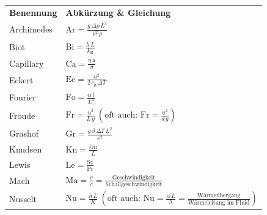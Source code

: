 \centering
\section*{}%

\setlength{\rowheight}{3.5mm}
\small

\begin{tabular}{l l}
    \xrowht[()]{\rowheight} \textbf{Benennung} & \textbf{Abkürzung \& Gleichung}                                                           \\[2.0ex]
    \xrowht[()]{\rowheight} Archimedes         & $\text{Ar} = \tfrac{g\,\Delta\rho\,L^3}{\nu^2\,\rho}$                                     \\
    \xrowht[()]{\rowheight} Biot               & $\text{Bi} = \tfrac{h\,L}{k_\text{B}}$                                                    \\
    \xrowht[()]{\rowheight} Capillary          & $\text{Ca} = \tfrac{\eta\,u}{\sigma}$                                                     \\
    \xrowht[()]{\rowheight} Eckert             & $\text{Ec} = \tfrac{u^2}{2\,c_p\,\Delta T}$                                               \\
    \xrowht[()]{\rowheight} Fourier            & $\text{Fo} = \tfrac{\alpha\,t}{L^2}$                                                      \\
    \xrowht[()]{\rowheight} Froude             & $\text{Fr} = \tfrac{u^2}{L\,g}~\left(\text{oft auch: Fr} = \tfrac{u^2}{d\,g}\right)$      \\
    \xrowht[()]{\rowheight} Grashof            & $\text{Gr} = \tfrac{g\,\beta\,\Delta T\,L^3}{\nu^2}$                                      \\
    \xrowht[()]{\rowheight} Knudsen            & $\text{Kn} = \tfrac{l\,m}{L}$                                                             \\
    \xrowht[()]{\rowheight} Lewis              & $\text{Le} = \tfrac{\text{Sc}}{\text{Pr}}$                                                \\
    \xrowht[()]{\rowheight} Mach               & $\text{Ma} = \tfrac{v}{c} = \tfrac{\text{Geschwindigkeit}}{\text{Schallgeschwindigkeit}}$ \\
    \xrowht[()]{\rowheight} Nusselt            & $\text{Nu} = \tfrac{h\,L}{K}~\left(\text{oft auch: Nu} = \tfrac{\alpha\,L}{\lambda} = \tfrac{\text{Wärmeübergang}}{\text{Wärmeleitung im Fluid}}\right)$ \\

\end{tabular}
